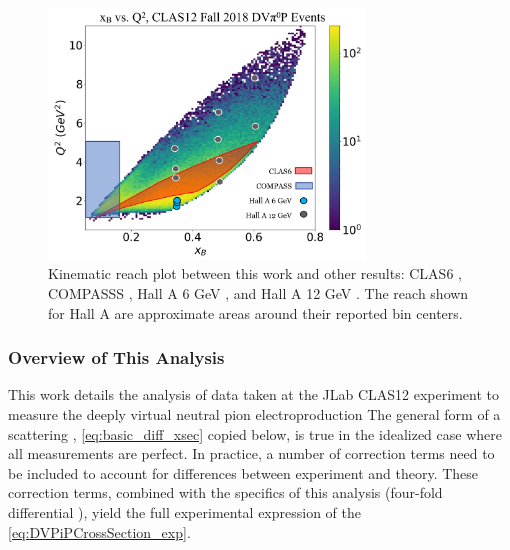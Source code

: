       
    
     
        \begin{figure}[H]
            \centering
            \includegraphics[width=0.75\textwidth]{Chapters/Ch1-Intro/Ch1-Sec2-GPDs-DVMP/pics/kinematic_overlap.png}
            \caption[Kinematic Reach Comparison]{Kinematic reach plot between this work and other results:  CLAS6 \parencite{Bedlinskiy2014ExclusiveCLAS}, COMPASSS \parencite{Alexeev2020MeasurementProton}, Hall A 6 GeV \parencite{Fuchey2011ExclusiveRegime}, and Hall A 12 GeV \parencite{Dlamini2021DeepRegime}. The reach shown for Hall A are approximate areas around their reported bin centers. }
            \label{fig:kinematicreach}
        \end{figure}

        \subsubsection*{Overview of This Analysis}\label{sec:anaflow}
    
    
        This work details the analysis of data taken at the JLab CLAS12 experiment to measure the deeply virtual neutral pion electroproduction \xsecp The general form of a scattering \xsec, \eqref{eq:basic_diff_xsec} copied below, is true in the idealized case where all measurements are perfect. In practice, a number of correction terms need to be included to account for differences between experiment and theory. These correction terms, combined with the specifics of this analysis (four-fold differential \xsec), yield the full experimental expression of the \xsec \eqref{eq:DVPiPCrossSection_exp}. 



